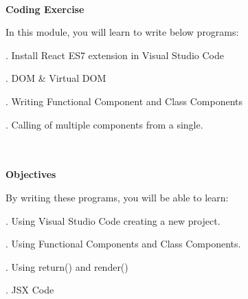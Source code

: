 \documentclass{article}
\begin{document}

\noindent 

\noindent \\
\textbf{Coding Exercise}

\noindent 
In this module, you will learn to write below programs:

. Install React ES7 extension in Visual Studio Code 

. DOM \& Virtual DOM

. Writing Functional Component and Class Components

. Calling of multiple components from a single.

\noindent 

\noindent \\\\

\noindent \textbf{Objectives}

\noindent 
By writing these programs, you will be able to learn:

. Using Visual Studio Code creating a new project.

. Using Functional Components and Class Components.

. Using return() and render()

. JSX Code
\end{document}
